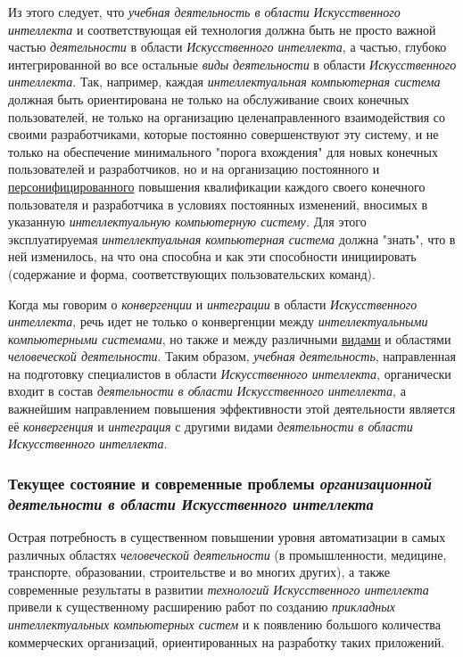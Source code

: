 Из этого следует, что \textit{учебная деятельность в области} \textit{Искусственного интеллекта} и соответствующая ей технология должна быть не просто важной частью \textit{деятельности} в области \textit{Искусственного интеллекта}, а частью, глубоко интегрированной во все остальные \textit{виды} \textit{деятельности} в области \textit{Искусственного интеллекта}. Так, например, каждая \textit{интеллектуальная компьютерная система} должная быть ориентирована не только на обслуживание своих конечных пользователей, не только на организацию целенаправленного взаимодействия со своими разработчиками, которые постоянно совершенствуют эту систему, и не только на обеспечение минимального "порога вхождения"{} для новых конечных пользователей и разработчиков, но и на организацию постоянного и \underline{персонифицированного} повышения квалификации каждого своего конечного пользователя и разработчика в условиях постоянных изменений, вносимых в указанную \textit{интеллектуальную компьютерную систему.} Для этого эксплуатируемая \textit{интеллектуальная компьютерная система} должна "знать"{}, что в ней изменилось, на что она способна и как эти способности инициировать (содержание и форма, соответствующих пользовательских команд).

Когда мы говорим о \textit{конвергенции} и \textit{интеграции} в области \textit{Искусственного интеллекта}, речь идет не только о конвергенции между \textit{интеллектуальными компьютерными системами}, но также и между различными \underline{видами} и областями \textit{человеческой деятельности}. Таким образом, \textit{учебная деятельность}, направленная на подготовку специалистов в области \textit{Искусственного интеллекта}, органически входит в состав \textit{деятельности в области} \textit{Искусственного интеллекта}, а важнейшим направлением повышения эффективности этой деятельности является её \textit{конвергенция} и \textit{интеграция} с другими видами \textit{деятельности в области Искусственного интеллекта}.

\subsubsection{Текущее состояние и современные проблемы \textbf{\textit{организационной деятельности в области Искусственного интеллекта}}}

Острая потребность в существенном повышении уровня автоматизации в самых различных областях \textit{человеческой деятельности} (в промышленности, медицине, транспорте, образовании, строительстве и во многих других), а также современные результаты в развитии \textit{технологий Искусственного интеллекта} привели к существенному расширению работ по созданию \textit{прикладных интеллектуальных компьютерных систем} и к появлению большого количества коммерческих организаций, ориентированных на разработку таких приложений.

